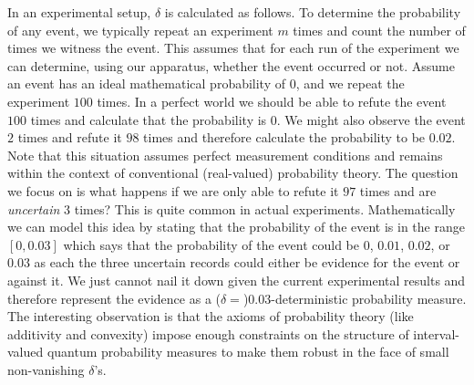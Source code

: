 \documentclass[english,reprint, aps, prl,superscriptaddress, showpacs,
showkeys, longbibliography, amsmath, amssymb, floatfix]{revtex4-1}
\theoremstyle{plain}
\theoremstyle{definition}
\begin{document}



In an experimental setup, $\delta$ is calculated as follows. To
determine the probability of any event, we typically repeat an
experiment $m$ times and count the number of times we witness the
event. This assumes that for each run of the experiment we can
determine, using our apparatus, whether the event occurred or
not. Assume an event has an ideal mathematical probability of $0$, and
we repeat the experiment $100$ times. In a perfect world we should be
able to refute the event $100$ times and calculate that the
probability is $0$. We might also observe the event $2$ times and
refute it $98$ times and therefore calculate the probability to be
$0.02$. Note that this situation assumes perfect measurement
conditions and remains within the context of conventional
(real-valued) probability theory. The question we focus on is what
happens if we are only able to refute it $97$ times and are
\emph{uncertain} $3$ times? This is quite common in actual
experiments. Mathematically we can model this idea by stating that the
probability of the event is in the range $\left[0,0.03\right]$ which
says that the probability of the event could be $0$, $0.01$, $0.02$,
or $0.03$ as each the three uncertain records could either be evidence
for the event or against it. We just cannot nail it down given the
current experimental results and therefore represent the evidence as a
($\delta=$)$0.03$-deterministic probability measure. The interesting
observation is that the axioms of probability theory (like additivity
and convexity) impose enough constraints on the structure of
interval-valued quantum probability measures to make them robust in
the face of small non-vanishing $\delta$'s.
\end{document}

